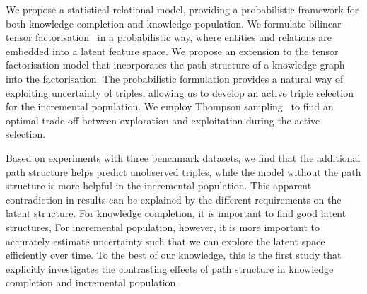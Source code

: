 We propose a statistical relational model, providing a probabilistic framework
for both knowledge completion and knowledge population.
We formulate bilinear tensor factorisation~\cite{nickel2011three} in a probabilistic way, where entities and relations are embedded into a latent feature space. 
We propose an extension to the tensor factorisation model that incorporates the path structure of a knowledge graph into the factorisation. 
The probabilistic formulation provides a natural way of exploiting uncertainty of triples,
allowing us to develop an active triple selection for the incremental population.
We employ Thompson sampling~\cite{scott10bandit} %
to find an optimal trade-off between exploration and exploitation during the active selection.

Based on experiments with three benchmark datasets, we find that the additional path structure helps predict unobserved triples, while the model without the path structure is more helpful in the incremental population.
This apparent contradiction in results can be explained by the different requirements on
the latent structure. For knowledge completion, it is important to find good latent structures,
For incremental population, however, it is more important to accurately estimate uncertainty
such that we can explore the latent space efficiently over time.
To the best of our knowledge, this is the first study that explicitly investigates the contrasting
effects of path structure in knowledge completion and incremental population.


